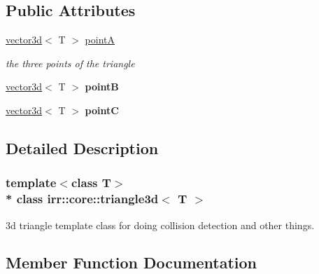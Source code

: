 \subsection*{Public Attributes}
\begin{DoxyCompactItemize}
\item 
\hyperlink{classirr_1_1core_1_1vector3d}{vector3d}$<$ T $>$ \hyperlink{classirr_1_1core_1_1triangle3d_ad4113299162b5855bccf8465b31ff78b}{pointA}\hypertarget{classirr_1_1core_1_1triangle3d_ad4113299162b5855bccf8465b31ff78b}{}\label{classirr_1_1core_1_1triangle3d_ad4113299162b5855bccf8465b31ff78b}

\begin{DoxyCompactList}\small\item\em the three points of the triangle \end{DoxyCompactList}\item 
\hyperlink{classirr_1_1core_1_1vector3d}{vector3d}$<$ T $>$ {\bfseries pointB}\hypertarget{classirr_1_1core_1_1triangle3d_a3ed5276e50f3d3b6a1e2483dffa822ac}{}\label{classirr_1_1core_1_1triangle3d_a3ed5276e50f3d3b6a1e2483dffa822ac}

\item 
\hyperlink{classirr_1_1core_1_1vector3d}{vector3d}$<$ T $>$ {\bfseries pointC}\hypertarget{classirr_1_1core_1_1triangle3d_a08e65517102b6d04f0537b876e152466}{}\label{classirr_1_1core_1_1triangle3d_a08e65517102b6d04f0537b876e152466}

\end{DoxyCompactItemize}


\subsection{Detailed Description}
\subsubsection*{template$<$class T$>$\\*
class irr\+::core\+::triangle3d$<$ T $>$}

3d triangle template class for doing collision detection and other things. 

\subsection{Member Function Documentation}
